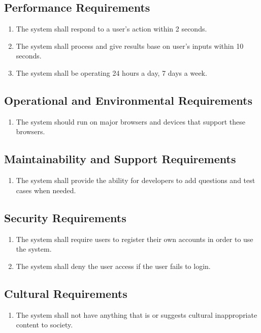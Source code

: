 \documentclass[12pt, titlepage]{article}
\begin{document}
\subsection{Performance Requirements}
\begin{enumerate}[label=NFR.\arabic*, resume]
    \item The system shall respond to a user's action within 2 seconds. \label{NFR.6}
    \item The system shall process and give results base on user's inputs within 10 seconds. \label{NFR.7}
    \item The system shall be operating 24 hours a day, 7 days a week. \label{NFR.8}
\end{enumerate}
\subsection{Operational and Environmental Requirements}
\begin{enumerate}[label=NFR.\arabic*, resume]
    \item The system should run on major browsers and devices that support these browsers. \label{NFR.9}
\end{enumerate}
\subsection{Maintainability and Support Requirements}
\begin{enumerate}[label=NFR.\arabic*, resume]
    \item The system shall provide the ability for developers to add questions and test cases when needed. \label{NFR.10}
\end{enumerate}
\subsection{Security Requirements}
\begin{enumerate}[label=NFR.\arabic*, resume]
    \item The system shall require users to register their own accounts in order to use the system. \label{NFR.11}
    \item The system shall deny the user access if the user fails to login. \label{NFR.12}
\end{enumerate}
\subsection{Cultural Requirements}
\begin{enumerate}[label=NFR.\arabic*, resume]
    \item The system shall not have anything that is or suggests cultural inappropriate content to society. \label{NFR.13}
\end{enumerate}
\end{document}
